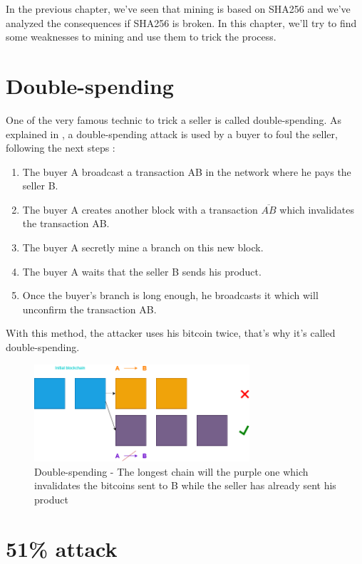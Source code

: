  In the previous chapter, we've seen that mining is based on SHA256 and we've analyzed the consequences if SHA256 is broken. In this chapter, we'll try to find some weaknesses to mining and use them to trick the process.

\section{Double-spending}

One of the very famous technic to trick a seller is called double-spending. As explained in \cite{double_spending_def}, a double-spending attack is used by a buyer to foul the seller, following the next steps :

\begin{enumerate}
  \item The buyer A broadcast a transaction AB in the network where he pays the seller B.
  \item The buyer A creates another block with a transaction $\overline{AB}$ which invalidates the transaction AB.
  \item The buyer A secretly mine a branch on this new block.
  \item The buyer A waits that the seller B sends his product.
  \item Once the buyer's branch is long enough, he broadcasts it which will unconfirm the transaction AB.
\end{enumerate}

With this method, the attacker uses his bitcoin twice, that's why it's called double-spending. \newline

\begin{figure}[h]
\centering
\captionsetup{justification=centering}
\includegraphics[width=8cm]{Figures/doubleSpending}
\caption{Double-spending - The longest chain will the purple one which invalidates the bitcoins sent to B while the seller has already sent his product}
\end{figure}
\medskip

\section{51\% attack}

